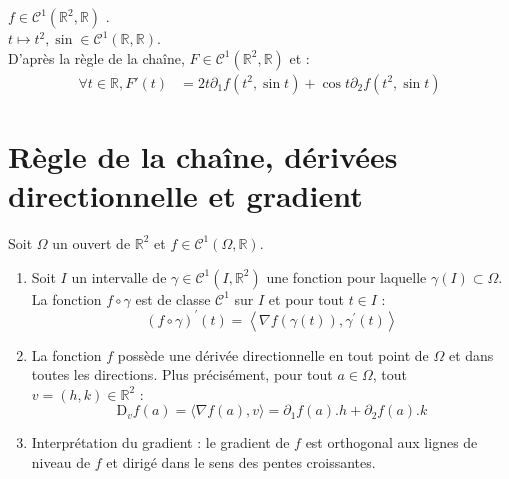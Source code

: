 \documentclass[../main.tex]{subfiles}
\begin{document}
\noindent $f\in \mathcal{C}^1(\mathbb{R}^2, \mathbb{R})$ .\\
$t\mapsto t^2, \sin \in \mathcal{C}^1(\mathbb{R}, \mathbb{R})$. \\
D'après la règle de la chaîne, $F\in \mathcal{C}^1(\mathbb{R}^2, \mathbb{R})$ et : 
\begin{align*}
    \forall t\in \mathbb{R}, F'(t) &= 2t \partial_1 f(t^2, \sin t) + \cos t \partial_2 f(t^2, \sin t)
\end{align*}

\section{Règle de la chaîne, dérivées directionnelle et gradient}
\begin{tcolorbox}[title=Théorème 36.46, title filled=false, colframe=orange, colback=orange!10!white]
    Soit $\Omega$ un ouvert de $\mathbb{R}^2$ et $f \in \mathcal{C}^1(\Omega, \mathbb{R})$.
    \begin{enumerate}
        \item Soit $I$ un intervalle de $\gamma \in \mathcal{C}^1\left(I, \mathbb{R}^2\right)$ une fonction pour laquelle $\gamma(I) \subset \Omega$. La fonction $f \circ \gamma$ est de classe $\mathcal{C}^1$ sur $I$ et pour tout $t \in I$ :
        $$(f \circ \gamma)^{\prime}(t)=\left\langle\nabla f(\gamma(t)), \gamma^{\prime}(t)\right\rangle$$

        \item La fonction $f$ possède une dérivée directionnelle en tout point de $\Omega$ et dans toutes les directions. Plus précisément, pour tout $a \in \Omega$, tout $v=(h, k) \in \mathbb{R}^2$ :
        $$\mathrm{D}_v f(a)=\langle\nabla f(a), v\rangle=\partial_1 f(a) . h+\partial_2 f(a) . k$$

        \item Interprétation du gradient : le gradient de $f$ est orthogonal aux lignes de niveau de $f$ et dirigé dans le sens des pentes croissantes.
    \end{enumerate}
\end{tcolorbox}
\end{document}
